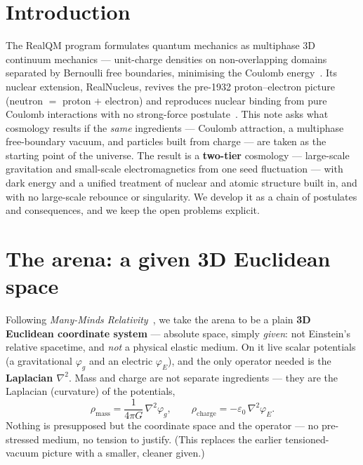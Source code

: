 \documentclass[11pt]{article}
\newcommand{\grad}{\nabla}
\begin{document}
\begin{abstract}
\medskip
\noindent\textbf{Status.} This is an exploratory proposal, not established cosmology. It departs
sharply from the Standard Model and $\Lambda$CDM and must eventually be reconciled with them; the
open problems in Section~\ref{sec:open} are load-bearing. Read it as ``what follows \emph{if}.''

\medskip
\noindent\textbf{Keywords:} cosmology; two-tier cosmology; induced gravity; proton--electron model of
the nucleus; dark energy; primordial nucleosynthesis; RealQM; multiphase Coulomb continuum mechanics.
\end{abstract}

\section{Introduction}
The RealQM program formulates quantum mechanics as multiphase 3D continuum mechanics --- unit-charge
densities on non-overlapping domains separated by Bernoulli free boundaries, minimising the Coulomb
energy~\cite{realqm}. Its nuclear extension, RealNucleus, revives the pre-1932 proton--electron
picture (neutron $=$ proton $+$ electron) and reproduces nuclear binding from pure Coulomb
interactions with no strong-force postulate~\cite{realnucleus}. This note asks what cosmology results
if the \emph{same} ingredients --- Coulomb attraction, a multiphase free-boundary vacuum, and
particles built from charge --- are taken as the starting point of the universe. The result is a
\textbf{two-tier} cosmology --- large-scale gravitation and small-scale electromagnetics from one seed
fluctuation --- with dark energy and a unified treatment of nuclear and atomic structure built in, and
with no large-scale rebounce or singularity. We develop it as a chain of postulates and consequences, and we keep the open
problems explicit.

\section{The arena: a given 3D Euclidean space}\label{sec:substrate}
Following \emph{Many-Minds Relativity}~\cite{mmr}, we take the arena to be a plain \textbf{3D Euclidean
coordinate system} --- absolute space, simply \emph{given}: not Einstein's relative spacetime, and
\emph{not} a physical elastic medium. On it live scalar potentials (a gravitational $\varphi_g$ and an
electric $\varphi_E$), and the only operator needed is the \textbf{Laplacian $\grad^2$}. Mass and charge
are not separate ingredients --- they are the Laplacian (curvature) of the potentials,
\[ \rho_{\text{mass}} = \frac{1}{4\pi G}\,\grad^2\varphi_g, \qquad
   \rho_{\text{charge}} = -\varepsilon_0\,\grad^2\varphi_E . \]
Nothing is presupposed but the coordinate space and the operator --- no pre-stressed medium, no tension to
justify. (This replaces the earlier tensioned-vacuum picture with a smaller, cleaner given.)
\end{document}

